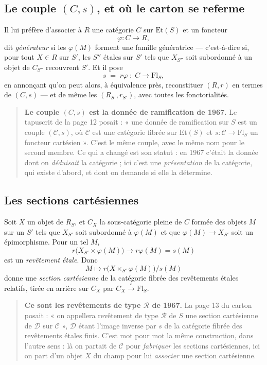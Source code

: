 \documentclass[11pt,a4paper]{article}
\begin{document}
\subsection*{Le couple $(C, s)$, et où le carton se referme}

Il lui préfère d'associer à $R$ une catégorie $C$ sur $\mathrm{Et}(S)$ et un
foncteur
\[
  \varphi : C \longrightarrow R ,
\]
dit \emph{générateur} si les $\varphi(M)$ forment une famille génératrice ---
c'est-à-dire si, pour tout $X \in R$ sur $S'$, les $S''$ étales sur $S'$ tels
que $X_{S''}$ soit subordonné à un objet de $C_{S''}$ recouvrent $S'$. Et il
pose
\[
  s \;=\; r\varphi \;:\; C \longrightarrow \mathrm{Fl}_{S} ,
\]
en annonçant qu'on peut alors, à équivalence près, reconstituer $(R, r)$ en
termes de $(C, s)$ --- et de même les $(R_{S'}, r_{S'})$, avec toutes les
fonctorialités.

\begin{quote}
\textbf{Le couple $(C, s)$ est la donnée de ramification de 1967.} Le tapuscrit
de la page 12 posait : « une donnée de ramification sur $S$ est un couple
$(\mathcal{C}, s)$, où $\mathcal{C}$ est une catégorie fibrée sur
$\mathrm{Et}(S)$ et $s : \mathcal{C} \to \mathrm{Fl}_{S}$ un foncteur
cartésien ». C'est le même couple, avec le même nom pour le second membre. Ce
qui a changé est son statut : en 1967 c'était la donnée dont on \emph{déduisait}
la catégorie ; ici c'est une \emph{présentation} de la catégorie, qui existe
d'abord, et dont on demande si elle la détermine.
\end{quote}

\subsection*{Les sections cartésiennes}

Soit $X$ un objet de $R_{S}$, et $C_{X}$ la sous-catégorie pleine de $C$ formée
des objets $M$ sur un $S'$ tels que $X_{S'}$ soit subordonné à $\varphi(M)$ et
que $\varphi(M) \to X_{S'}$ soit un épimorphisme. Pour un tel $M$,
\[
  r\bigl(X_{S'} \times \varphi(M)\bigr) \longrightarrow r\varphi(M) = s(M)
\]
est un \emph{revêtement étale}. Donc
\[
  M \longmapsto r\bigl(X \times_{S'} \varphi(M)\bigr) \big/ s(M)
\]
donne une \emph{section cartésienne} de la catégorie fibrée des revêtements
étales relatifs, tirée en arrière sur $C_{X}$ par
$C_{X} \xrightarrow{\ s\ } \mathrm{Fl}_{S}$.

\begin{quote}
\textbf{Ce sont les revêtements de type $\mathcal{R}$ de 1967.} La page 13 du
carton posait : « on appellera revêtement de type $\mathcal{R}$ de $S$ une
section cartésienne de $\mathcal{D}$ sur $\mathcal{C}$ », $\mathcal{D}$ étant
l'image inverse par $s$ de la catégorie fibrée des revêtements étales finis.
C'est mot pour mot la même construction, dans l'autre sens : là on partait de
$\mathcal{C}$ pour \emph{fabriquer} les sections cartésiennes, ici on part d'un
objet $X$ du champ pour lui \emph{associer} une section cartésienne.
\end{quote}
\end{document}
